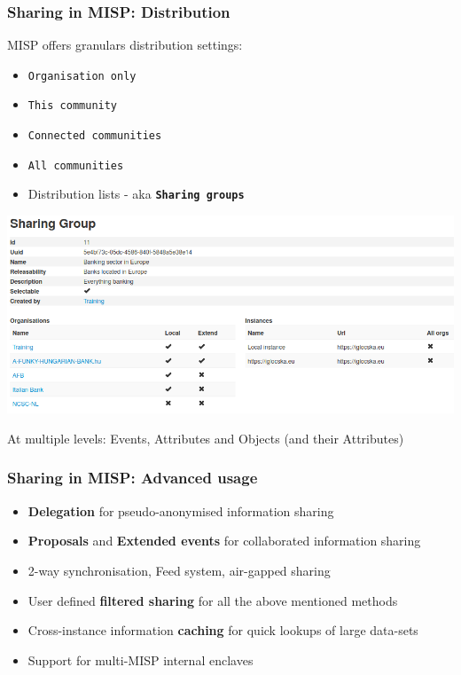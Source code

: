 \begin{frame}
\frametitle{Sharing in MISP: Distribution}
    MISP offers granulars distribution settings:
    \begin{itemize}
        \item \texttt{Organisation only}
        \item \texttt{This community}
        \item \texttt{Connected communities}
        \item \texttt{All communities}
        \item Distribution lists - aka \texttt{\bf Sharing groups}
    \end{itemize}
    \begin{center}
    \includegraphics[scale=0.2]{screenshots/sg-example.png}
    \end{center}

    At multiple levels: Events, Attributes and Objects (and their Attributes)
\end{frame}

\begin{frame}
\frametitle{Sharing in MISP: Advanced usage}
    \begin{itemize}
        \item {\bf Delegation} for pseudo-anonymised information sharing
        \item {\bf Proposals} and {\bf Extended events} for collaborated information sharing
        \item 2-way synchronisation, Feed system, air-gapped sharing
        \item User defined {\bf filtered sharing} for all the above mentioned methods
        \item Cross-instance information {\bf caching} for quick lookups of large data-sets
        \item Support for multi-MISP internal enclaves
    \end{itemize}
\end{frame}

